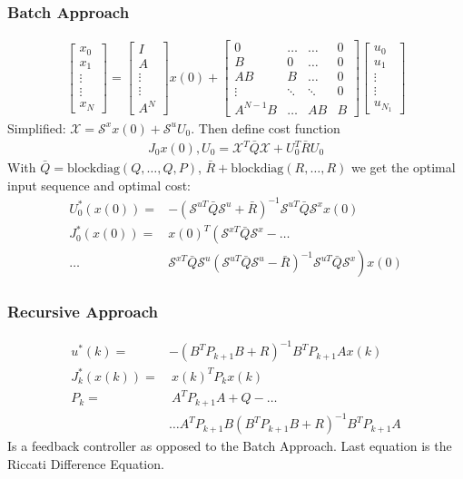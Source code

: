 \documentclass[a4paper,landscape,8pt,fleqn]{scrartcl}
\newcommand{\Me}[1]{\begin{bmatrix}#1\end{bmatrix}} %
\newcommand{\mc}[1]{\mathcal{#1}}
\begin{document}
\begin{multicols}{3}
\subsubsection{Batch Approach}
\begin{align*}
	\Me{x_0 \\ x_1 \\ \vdots \\ \vdots \\ x_N } = \Me{I \\ A \\ \vdots \\ \vdots \\ A^N}x(0)+\Me{0 & \dots & \dots  & 0 \\ B & 0 & \dots & 0 \\ AB & B & \dots & 0 \\ \vdots & \ddots & \ddots & 0 \\ A^{N-1}B & \dots & AB & B}\Me{u_0 \\ u_1 \\ \vdots \\ \vdots \\ u_{N_1}}
\end{align*}
Simplified: $ \mc{X} = \mc{S}^x x(0) + \mc{S}^u U_0$. Then define cost function
\begin{align*}
	J_0{x(0), U_0} = \mc{X}^T \bar{Q} \mc{X} + U_0^T \bar{R} U_0
\end{align*}
With $\bar{Q} = \mathrm{blockdiag}(Q,\dots,Q,P)$, $\bar{R} + \mathrm{blockdiag}(R,\dots,R)$ we get the optimal input sequence and optimal cost:
\begin{align*}
	U_0^*(x(0)) =& -(\mc{S}^{uT} \bar{Q} \mc{S}^u + \bar{R})^{-1}\mc{S}^{uT}\bar{Q}\mc{S}^x x(0) \\
	J_0^*(x(0))=&x(0)^T \left(\mc{S}^{xT} \bar{Q} \mc{S}^x - \right. \dots \\ \dots &\left. \mc{S}^{xT}\bar{Q}\mc{S}^u(\mc{S}^{uT}\bar{Q}\mc{S}^u- \bar{R})^{-1} \mc{S}^{uT}\bar{Q}\mc{S}^x \right) x(0)
\end{align*}

\subsubsection{Recursive Approach}
\begin{align*}
	u^*(k)=&-(B^T P_{k+1} B + R)^{-1} B^T P_{k+1} A x(k)\\
	J^*_k(x(k)) =& ~x(k)^T P_k x(k)\\
	P_k =& ~A^T P_{k+1}A + Q - \dots \\ &\dots A^T P_{k+1}B\left( B^T P_{k+1} B + R\right)^{-1} B^T P_{k+1}A
\end{align*}
Is a feedback controller as opposed to the Batch Approach. Last equation is the Riccati Difference Equation. 


\end{multicols}
\end{document}
